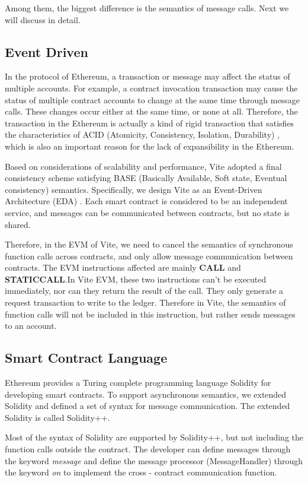 \documentclass[UTF8,nofonts]{article}
\begin{document}
\begin{multicols}{2}
Among them, the biggest difference is the semantics of message calls. Next we will discuss in detail.

\subsection{Event Driven}
In the protocol of Ethereum, a transaction or message may affect the status of multiple accounts. For example, a contract invocation transaction may cause the status of multiple contract accounts to change at the same time through message calls. These changes occur either at the same time, or none at all. Therefore, the transaction in the Ethereum is actually a kind of rigid transaction that satisfies the characteristics of ACID (Atomicity, Consistency, Isolation, Durability) \cite{Haerder:1983:PTD:289.291}, which is also an important reason for the lack of expansibility in the Ethereum.

Based on considerations of scalability and performance, Vite adopted a final consistency scheme satisfying BASE (Basically Available, Soft state, Eventual consistency) \cite{Pritchett:2008:BAA:1394127.1394128} semantics. Specifically, we design Vite as an Event-Driven Architecture (EDA) \cite{eda}. Each smart contract is considered to be an independent service, and messages can be communicated between contracts, but no state is shared.

Therefore, in the EVM of Vite, we need to cancel the semantics of synchronous function calls across contracts, and only allow message communication between contracts. The EVM instructions affected are mainly \textbf{CALL} and \textbf{STATICCALL}.In Vite EVM, these two instructions can’t be executed immediately, nor can they return the result of the call. They only generate a request transaction to write to the ledger. Therefore in Vite, the semantics of function calls will not be included in this instruction, but rather sends messages to an account.

\subsection{Smart Contract Language}
Ethereum provides a Turing complete programming language Solidity for developing smart contracts. To support asynchronous semantics, we extended Solidity and defined a set of syntax for message communication. The extended Solidity is called Solidity++.

Most of the syntax of Solidity are supported by Solidity++, but not including the function calls outside the contract. The developer can define messages through the keyword \emph{message} and define the message processor (MessageHandler) through the keyword \emph{on} to implement the cross - contract communication function.


\end{multicols}
\end{document}
